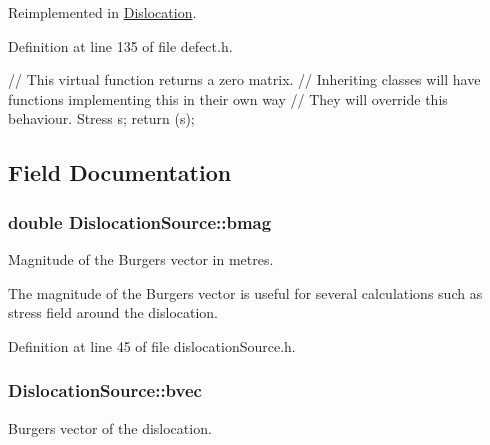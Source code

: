 \-Reimplemented in \hyperlink{classDislocation_af61cedf5305080ce0f55eb7177efe529}{\-Dislocation}.



\-Definition at line 135 of file defect.\-h.


\begin{DoxyCode}
  {
    // This virtual function returns a zero matrix.
    // Inheriting classes will have functions implementing this in their own
       way
    // They will override this behaviour.
    Stress s;
    return (s);
  }
\end{DoxyCode}


\subsection{\-Field \-Documentation}
\hypertarget{classDislocationSource_a59c95f3cb5af5180d2c42792413f7816}{
\subsubsection[{bmag}]{\setlength{\rightskip}{0pt plus 5cm}double {\bf \-Dislocation\-Source\-::bmag}}}\label{de/de3/classDislocationSource_a59c95f3cb5af5180d2c42792413f7816}


\-Magnitude of the \-Burgers vector in metres. 

\-The magnitude of the \-Burgers vector is useful for several calculations such as stress field around the dislocation. 

\-Definition at line 45 of file dislocation\-Source.\-h.

\hypertarget{classDislocationSource_ade4753ac6106317c693c2bba4f83a568}{
\subsubsection[{bvec}]{ {\bf \-Dislocation\-Source\-::bvec}}}\label{de/de3/classDislocationSource_ade4753ac6106317c693c2bba4f83a568}


\-Burgers vector of the dislocation. 



